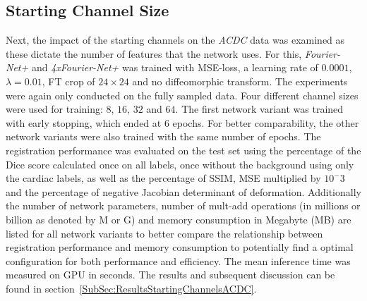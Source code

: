 \documentclass[english,version-2022-01]{uzl-thesis} %
\begin{document}
\subsection{Starting Channel Size} \label{SubSec:StartingChannelsACDC}
Next, the impact of the starting channels on the \emph{ACDC} data was examined as these dictate the number of features that the network uses. For this, \emph{Fourier-Net+} and \emph{4xFourier-Net+} was trained with MSE-loss, a learning rate of $0.0001$, $\lambda = 0.01$, FT crop of $24 \times 24$ and no diffeomorphic transform. The experiments were again only conducted on the fully sampled data. Four different channel sizes were used for training: $8$, $16$, $32$ and $64$. The first network variant was trained with early stopping, which ended at 6 epochs. For better comparability, the other network variants were also trained with the same number of epochs. The registration performance was evaluated on the test set using the percentage of the Dice score calculated once on all labels, once without the background using only the cardiac labels, as well as the percentage of SSIM, MSE multiplied by $10^-3$ and the percentage of negative Jacobian determinant of deformation. Additionally the number of network parameters, number of mult-add operations (in millions or billion as denoted by M or G) and memory consumption in Megabyte (MB) are listed for all network variants to better compare the relationship between registration performance and memory consumption to potentially find a optimal configuration for both performance and efficiency. The mean inference time was measured on GPU in seconds. The results and subsequent discussion can be found in section~\ref{SubSec:ResultsStartingChannelsACDC}.
\end{document}
